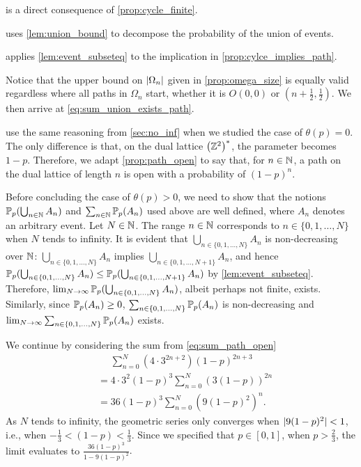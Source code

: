\documentclass[a4paper, 12pt]{article}
\begin{document}
 is a direct consequence of \cref{prop:cycle_finite}.

 uses \cref{lem:union_bound} to decompose the probability of the union of events.

 applies \cref{lem:event_subseteq} to the implication in \cref{prop:cylce_implies_path}.

Notice that the upper bound on $\lvert \Omega_n \rvert$ given in \cref{prop:omega_size} is equally valid regardless where all paths in $\Omega_n$ start, whether it is $O(0, 0)$ or $(n + \frac{1}{2}, \frac{1}{2})$. We then arrive at \cref{eq:sum_union_exists_path}.

 use the same reasoning from \cref{sec:no_inf} when we studied the case of $\theta(p) = 0$. The only difference is that, on the dual lattice $\left(\mathbb{Z}^2\right)^*$, the parameter becomes $1 - p$. Therefore, we adapt \cref{prop:path_open} to say that, for $n \in \mathbb{N}$, a path on the dual lattice of length $n$ is open with a probability of $(1 - p)^n$.

Before concluding the case of $\theta(p) > 0$, we need to show that the notions $\mathbb{P}_p(\bigcup_{n \in \mathbb{N}} A_n)$ and $\sum_{n \in \mathbb{N}} \mathbb{P}_p(A_n)$ used above are well defined, where $A_n$ denotes an arbitrary event. Let $N \in \mathbb{N}$. The range $n \in \mathbb{N}$ corresponds to $n \in \{0, 1, \dots, N\}$ when $N$ tends to infinity. It is evident that $\bigcup_{n \in \{0, 1, \dots, N\}} A_n$ is non-decreasing over $\mathbb{N}$: $\bigcup_{n \in \{0, 1, \dots, N\}} A_n$ implies $\bigcup_{n \in \{0, 1, \dots, N + 1\}} A_n$, and hence $\mathbb{P}_p(\bigcup_{n \in \{0, 1, \dots, N\}} A_n) \leq \mathbb{P}_p(\bigcup_{n \in \{0, 1, \dots, N + 1\}} A_n)$ by \cref{lem:event_subseteq}. Therefore, $\lim_{N \to \infty} \mathbb{P}_p(\bigcup_{n \in \{0, 1, \dots, N\}} A_n)$, albeit perhaps not finite, exists. Similarly, since $\mathbb{P}_p(A_n) \geq 0$, $\sum_{n \in \{0, 1, \dots, N\}} \mathbb{P}_p(A_n)$ is non-decreasing and $\lim_{N \to \infty} \sum_{n \in \{0, 1, \dots, N\}}\mathbb{P}_p(A_n)$ exists.

We continue by considering the sum from \cref{eq:sum_path_open}
\begin{align*}
    &\phantom{=} \sum_{n = 0}^N (4 \cdot 3^{2n + 2}) (1 - p)^{2n + 3}\\
    &= 4 \cdot 3^2 (1 - p)^3 \sum_{n = 0}^N \left(3 (1 - p)\right)^{2n}\\
    &= 36 (1 - p)^3 \sum_{n = 0}^N \left(9 (1 - p)^2\right)^n.
\end{align*}
As $N$ tends to infinity, the geometric series only converges when $\lvert 9 (1 - p)^2 \rvert < 1$, i.e., when $-\frac{1}{3} < (1 - p) < \frac{1}{3}$. Since we specified that $p \in \left[0, 1\right]$, when $p > \frac{2}{3}$, the limit evaluates to
$
    \frac{36 (1 - p)^3}{1 - 9 (1 - p)^2}.
$
\end{document}
